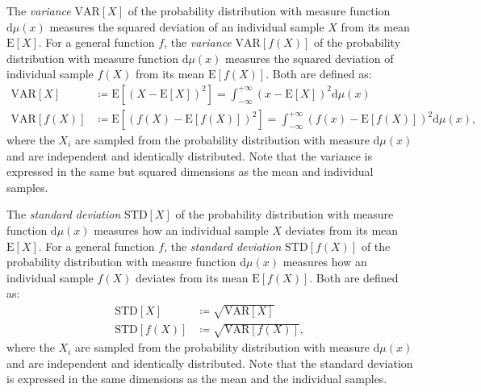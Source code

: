 \documentclass[10pt,a4paper]{article}
\numberwithin{equation}{section}
\begin{document}
The \textit{variance} $\mathrm{VAR}\left[X\right]$ of the probability distribution with measure function $\mathrm{d}\mu\left(x\right)$ measures the squared deviation of an individual sample $X$ from its mean $\mathrm{E}\left[X\right]$. For a general function $f$, the \textit{variance} $\mathrm{VAR}\left[f\left(X\right)\right]$ of the probability distribution with measure function $\mathrm{d}\mu\left(x\right)$ measures the squared deviation of individual sample $f\left(X\right)$ from its mean $\mathrm{E}\left[f\left(X\right)\right]$. Both are defined as:
\begin{align}
\label{equation:VAR}\mathrm{VAR}\left[X\right] 					&\coloneqq  \mathrm{E}\left[{\left(X-\mathrm{E}\left[X\right]\right)}^{2}\right] = \int_{-\infty}^{+\infty} {\left(x-\mathrm{E}\left[X\right]\right)}^{2} \mathrm{d}\mu\left(x\right) \\
\label{equation:VARf}\mathrm{VAR}\left[f\left(X\right)\right] 	&\coloneqq  \mathrm{E}\left[{\left(f\left(X\right)-\mathrm{E}\left[f\left(X\right)\right]\right)}^{2}\right] = \int_{-\infty}^{+\infty} {\left(f\left(x\right)-\mathrm{E}\left[f\left(X\right)\right]\right)}^{2} \mathrm{d}\mu\left(x\right),
\end{align}
where the $X_{i}$ are sampled from the probability distribution with measure $\mathrm{d}\mu\left(x\right)$ and are independent and identically distributed. Note that the variance is expressed in the same but squared dimensions as the mean and individual samples.

The \textit{standard deviation} $\mathrm{STD}\left[X\right]$ of the probability distribution with measure function $\mathrm{d}\mu\left(x\right)$ measures how an individual sample $X$ deviates from its mean $\mathrm{E}\left[X\right]$. For a general function $f$, the \textit{standard deviation} $\mathrm{STD}\left[f\left(X\right)\right]$ of the probability distribution with measure function $\mathrm{d}\mu\left(x\right)$ measures how an individual sample $f\left(X\right)$ deviates from its mean $\mathrm{E}\left[f\left(X\right)\right]$. Both are defined as:
\begin{align}
\label{equation:STD}\mathrm{STD}\left[X\right] 					&\coloneqq \sqrt{\mathrm{VAR}\left[X\right]} \\
\label{equation:STDf}\mathrm{STD}\left[f\left(X\right)\right] 	&\coloneqq \sqrt{\mathrm{VAR}\left[f\left(X\right)\right]},
\end{align}
where the $X_{i}$ are sampled from the probability distribution with measure $\mathrm{d}\mu\left(x\right)$ and are independent and identically distributed. Note that the standard deviation is expressed in the same dimensions as the mean and the individual samples.
\end{document}
